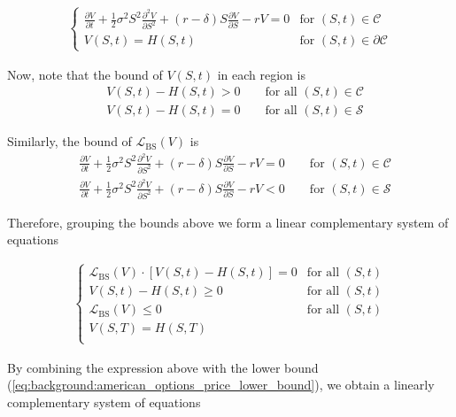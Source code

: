 \begin{align}
  \begin{cases}
  \frac{\partial{V}}{\partial{t}} + \frac{1}{2}\sigma^{2} S^2 \frac{\partial^2{V}}{\partial{S^2}} + (r - \delta)S \frac{\partial{V}}{\partial{S}} - rV = 0 & \text{for $(S, t) \in \mathcal{C}$} \\
  V(S, t) = H(S, t) & \text{for $(S,t)\in \partial\mathcal{C}$}
  \end{cases}
  \label{eq:background:finance:american_options_pde_free_boundary_problem}
\end{align}

Now, note that the bound of $V(S, t)$ in each region is
\begin{align*}
  &V(S, t) - H(S, t) > 0 \qquad \text{for all $(S,t) \in \mathcal{C}$} \\ 
  &V(S, t) - H(S, t) = 0 \qquad \text{for all $(S,t) \in \mathcal{S}$}
\end{align*}

Similarly, the bound of $\mathcal{L}_{\text{BS}}(V)$ is
\begin{align*}
  &\frac{\partial{V}}{\partial{t}} + \frac{1}{2}\sigma^{2} S^2 \frac{\partial^2{V}}{\partial{S^2}} + (r - \delta)S \frac{\partial{V}}{\partial{S}} - rV = 0 \qquad \text{for $(S,t) \in \mathcal{C}$} \\
  &\frac{\partial{V}}{\partial{t}} + \frac{1}{2}\sigma^{2} S^2 \frac{\partial^2{V}}{\partial{S^2}} + (r - \delta)S \frac{\partial{V}}{\partial{S}} - rV < 0 \qquad \text{for $(S,t) \in \mathcal{S}$}
\end{align*}

Therefore, grouping the bounds above we form a linear complementary system of equations

{
  \color{red}  
  \begin{align*}
    \begin{cases}
      \mathcal{L}_{\text{BS}}(V) \cdot [V(S,t) - H(S,t)] = 0 & \text{for all $(S,t)$} \\
      V(S, t) - H(S, t) \ge 0 & \text{for all $(S, t)$}\\
      \mathcal{L}_{\text{BS}}(V) \le 0 &  \text{for all $(S, t)$}\\
      V(S, T) = H(S, T) \\  
    \end{cases}
  \end{align*}
}

By combining the expression above with the lower bound (\ref*{eq:background:american_options_price_lower_bound}),
we obtain a linearly complementary system of equations

